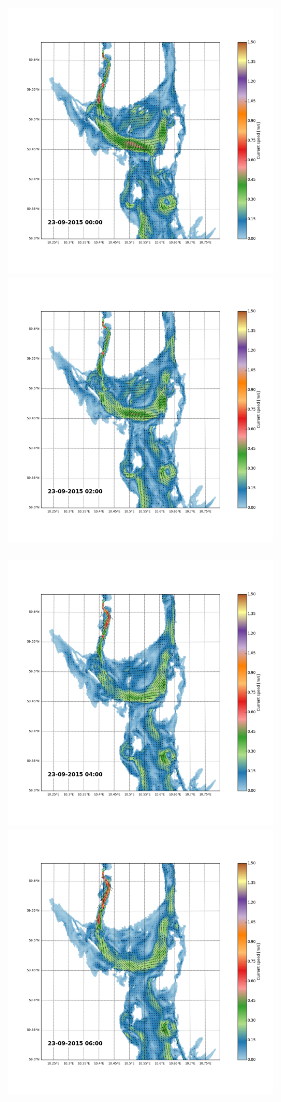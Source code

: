 \documentclass[12pt,a4paper,english]{article}
\begin{document}
\begin{figure}[ht]
\centerline{
\includegraphics*[trim=2.0cm 3cm 6.0cm 3.5cm,clip=true,height=7cm]{Python/stromfelt_106}
\includegraphics*[trim=3.7cm 3cm 1.3cm 3.5cm,clip=true,height=7cm]{Python/stromfelt_108}
}
\centerline{
\includegraphics*[trim=2.0cm 3cm 6.0cm 3.5cm,clip=true,height=7cm]{Python/stromfelt_110}
\includegraphics*[trim=3.7cm 3cm 1.3cm 3.5cm,clip=true,height=7cm]{Python/stromfelt_112}
}
\end{figure}
\end{document}
